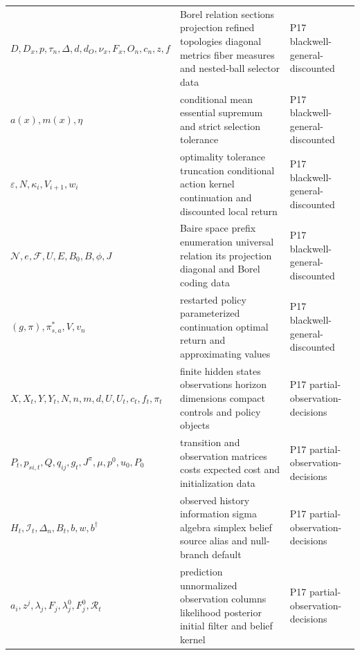 \begin{longtable}{@{}p{}p{}p{}@{}}
\(D,\allowbreak D_x,\allowbreak p,\allowbreak \tau_n,\allowbreak \Delta,\allowbreak d,\allowbreak d_O,\allowbreak \nu_x,\allowbreak F_x,\allowbreak O_n,\allowbreak c_n,\allowbreak z,\allowbreak f\) & Borel relation sections projection refined topologies diagonal metrics fiber measures and nested-ball selector data & P17 blackwell-\allowbreak{}general-\allowbreak{}discounted \\
\(a(x),\allowbreak m(x),\allowbreak \eta\) & conditional mean essential supremum and strict selection tolerance & P17 blackwell-\allowbreak{}general-\allowbreak{}discounted \\
\(\varepsilon,\allowbreak N,\allowbreak \kappa_i,\allowbreak V_{i+1},\allowbreak w_i\) & optimality tolerance truncation conditional action kernel continuation and discounted local return & P17 blackwell-\allowbreak{}general-\allowbreak{}discounted \\
\(\mathcal N,\allowbreak e,\allowbreak \mathcal F,\allowbreak U,\allowbreak E,\allowbreak B_0,\allowbreak B,\allowbreak \phi,\allowbreak J\) & Baire space prefix enumeration universal relation its projection diagonal and Borel coding data & P17 blackwell-\allowbreak{}general-\allowbreak{}discounted \\
\((g,\allowbreak \pi),\allowbreak \pi^*_{s,a},\allowbreak V,\allowbreak v_n\) & restarted policy parameterized continuation optimal return and approximating values & P17 blackwell-\allowbreak{}general-\allowbreak{}discounted \\
\(X,\allowbreak X_t,\allowbreak Y,\allowbreak Y_t,\allowbreak N,\allowbreak n,\allowbreak m,\allowbreak d,\allowbreak U,\allowbreak U_t,\allowbreak c_t,\allowbreak f_t,\allowbreak \pi_t\) & finite hidden states observations horizon dimensions compact controls and policy objects & P17 partial-\allowbreak{}observation-\allowbreak{}decisions \\
\(P_t,\allowbreak p_{si,t},\allowbreak Q,\allowbreak q_{ij},\allowbreak g_t,\allowbreak J^\pi,\allowbreak \mu,\allowbreak p^0,\allowbreak u_0,\allowbreak P_0\) & transition and observation matrices costs expected cost and initialization data & P17 partial-\allowbreak{}observation-\allowbreak{}decisions \\
\(H_t,\allowbreak \mathcal I_t,\allowbreak \Delta_n,\allowbreak B_t,\allowbreak b,\allowbreak w,\allowbreak b^\dagger\) & observed history information sigma algebra simplex belief source alias and null-branch default & P17 partial-\allowbreak{}observation-\allowbreak{}decisions \\
\(a_i,\allowbreak z^j,\allowbreak \lambda_j,\allowbreak F_j,\allowbreak \lambda_j^0,\allowbreak F_j^0,\allowbreak \mathcal R_t\) & prediction unnormalized observation columns likelihood posterior initial filter and belief kernel & P17 partial-\allowbreak{}observation-\allowbreak{}decisions \\

\end{longtable}
